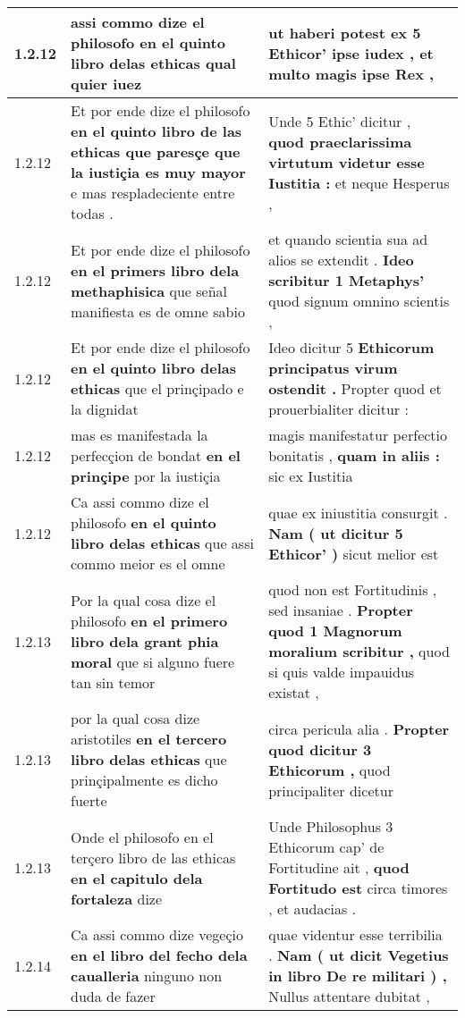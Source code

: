 \begin{tabular}{|p{1cm}|p{6.5cm}|p{6.5cm}|}
1.2.12 & assi commo dize el philosofo \textbf{ en el quinto libro delas ethicas } qual quier iuez & ut haberi potest \textbf{ ex 5 Ethicor’ ipse iudex , } et multo magis ipse Rex , \\\hline
1.2.12 & Et por ende dize el philosofo \textbf{ en el quinto libro de las ethicas que paresçe que la iustiçia es muy mayor } e mas respladeciente entre todas . & Unde 5 Ethic’ dicitur , \textbf{ quod praeclarissima virtutum videtur esse Iustitia : } et neque Hesperus , \\\hline
1.2.12 & Et por ende dize el philosofo \textbf{ en el primers libro dela methaphisica } que señal manifiesta es de omne sabio & et quando scientia sua ad alios se extendit . \textbf{ Ideo scribitur 1 Metaphys’ } quod signum omnino scientis , \\\hline
1.2.12 & Et por ende dize el philosofo \textbf{ en el quinto libro delas ethicas } que el prinçipado e la dignidat & Ideo dicitur 5 \textbf{ Ethicorum principatus virum ostendit . } Propter quod et prouerbialiter dicitur : \\\hline
1.2.12 & mas es manifestada la perfecçion de bondat \textbf{ en el prinçipe } por la iustiçia & magis manifestatur perfectio bonitatis , \textbf{ quam in aliis : } sic ex Iustitia \\\hline
1.2.12 & Ca assi commo dize el philosofo \textbf{ en el quinto libro delas ethicas } que assi commo meior es el omne & quae ex iniustitia consurgit . \textbf{ Nam ( ut dicitur 5 Ethicor’ ) } sicut melior est \\\hline
1.2.13 & Por la qual cosa dize el philosofo \textbf{ en el primero libro dela grant phia moral } que si alguno fuere tan sin temor & quod non est Fortitudinis , sed insaniae . \textbf{ Propter quod 1 Magnorum moralium scribitur , } quod si quis valde impauidus existat , \\\hline
1.2.13 & por la qual cosa dize aristotiles \textbf{ en el tercero libro delas ethicas } que prinçipalmente es dicho fuerte & circa pericula alia . \textbf{ Propter quod dicitur 3 Ethicorum , } quod principaliter dicetur \\\hline
1.2.13 & Onde el philosofo en el terçero libro de las ethicas \textbf{ en el capitulo dela fortaleza } dize & Unde Philosophus 3 Ethicorum cap’ de Fortitudine ait , \textbf{ quod Fortitudo est } circa timores , et audacias . \\\hline
1.2.14 & Ca assi commo dize vegeçio \textbf{ en el libro del fecho dela caualleria } ninguno non duda de fazer & quae videntur esse terribilia . \textbf{ Nam ( ut dicit Vegetius in libro De re militari ) , } Nullus attentare dubitat , \\\hline

\end{tabular}
